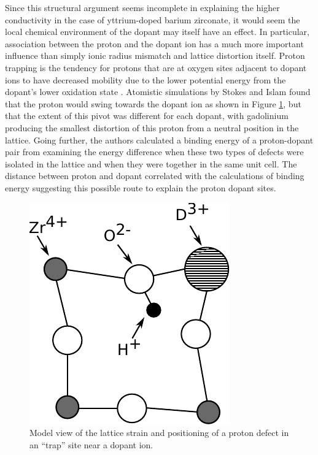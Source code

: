 Since this structural argument seems incomplete in explaining the higher conductivity in the case of yttrium-doped barium zirconate, it would seem the local chemical environment of the dopant may itself have an effect. In particular, association between the proton and the dopant ion has a much more important influence than simply ionic radius mismatch and lattice distortion itself. Proton trapping is the tendency for protons that are at oxygen sites adjacent to dopant ions to have decreased mobility due to the lower potential energy from the dopant's lower oxidation state \cite{Islam2004}. Atomistic simulations by Stokes and Islam \cite{Stokes2010} found that the proton would swing towards the dopant ion as shown in Figure \ref{fig:back:protonTrapping}, but that the extent of this pivot was different for each dopant, with gadolinium producing the smallest distortion of this proton from a neutral position in the lattice. Going further, the authors calculated a binding energy of a proton-dopant pair from examining the energy difference when these two types of defects were isolated in the lattice and when they were together in the same unit cell. The distance between proton and dopant correlated with the calculations of binding energy suggesting this possible route to explain the proton dopant sites.  
\begin{figure}
    \centering
    \includegraphics{Figures/BaZrO_3-dopant-lattice-strain.pdf}
    \caption{Model view of the lattice strain and positioning of a proton defect in an ``trap'' site near a dopant ion.}
    \label{fig:back:protonTrapping}
\end{figure}

